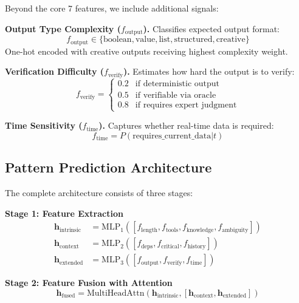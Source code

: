 \documentclass{article}
\theoremstyle{plain}
\theoremstyle{definition}
\theoremstyle{remark}
\begin{document}
Beyond the core 7 features, we include additional signals:

\textbf{Output Type Complexity ($f_{\text{output}}$).} Classifies expected output format:
\begin{equation}
	f_{\text{output}} \in \{\text{boolean}, \text{value}, \text{list}, \text{structured}, \text{creative}\}
\end{equation}
One-hot encoded with creative outputs receiving highest complexity weight.

\textbf{Verification Difficulty ($f_{\text{verify}}$).} Estimates how hard the output is to verify:
\begin{equation}
	f_{\text{verify}} = \begin{cases}
		0.2 & \text{if deterministic output} \\
		0.5 & \text{if verifiable via oracle} \\
		0.8 & \text{if requires expert judgment}
	\end{cases}
\end{equation}

\textbf{Time Sensitivity ($f_{\text{time}}$).} Captures whether real-time data is required:
\begin{equation}
	f_{\text{time}} = P(\text{requires\_current\_data} | t)
\end{equation}

\subsection{Pattern Prediction Architecture}
\label{sec:car_architecture}

The complete \car{} architecture consists of three stages:

\textbf{Stage 1: Feature Extraction}
\begin{align}
	\mathbf{h}_{\text{intrinsic}} &= \text{MLP}_1([f_{\text{length}}, f_{\text{tools}}, f_{\text{knowledge}}, f_{\text{ambiguity}}]) \\
	\mathbf{h}_{\text{context}} &= \text{MLP}_2([f_{\text{deps}}, f_{\text{critical}}, f_{\text{history}}]) \\
	\mathbf{h}_{\text{extended}} &= \text{MLP}_3([f_{\text{output}}, f_{\text{verify}}, f_{\text{time}}])
\end{align}

\textbf{Stage 2: Feature Fusion with Attention}
\begin{equation}
	\mathbf{h}_{\text{fused}} = \text{MultiHeadAttn}(\mathbf{h}_{\text{intrinsic}}, [\mathbf{h}_{\text{context}}, \mathbf{h}_{\text{extended}}])
\end{equation}
\end{document}
